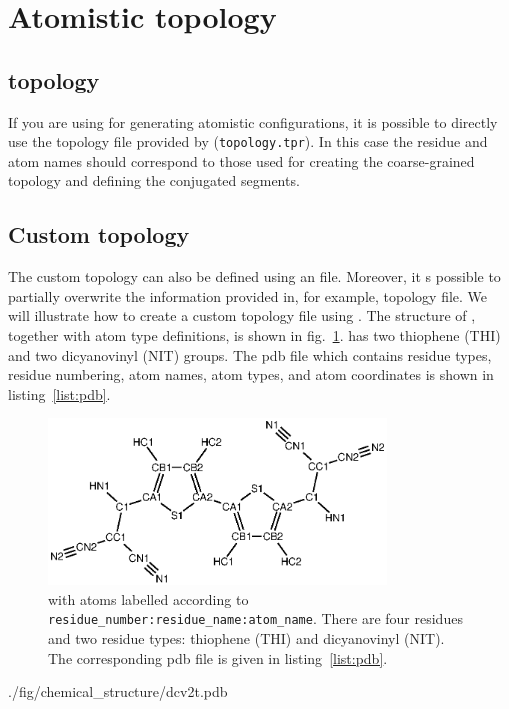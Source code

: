 \section{Atomistic topology}
\label{sec:atomistic}
\subsection{\gromacs topology}
If you are using \gromacs for generating atomistic configurations, it is possible to directly use the topology file provided by \gromacs (\texttt{topology.tpr}). In this case the residue and atom names should correspond to those used  for creating the coarse-grained topology and defining the conjugated segments. 

\subsection{Custom topology}
The custom topology can also be defined using an \xml file. Moreover, it s possible to partially overwrite the information provided in, for example, \gromacs topology file. We will illustrate how to create a custom topology file using \dcvt. The structure of \dcvt, together with atom type definitions, is shown in fig.~\ref{fig:dcv2t_at}. \dcvt has two thiophene (THI) and two dicyanovinyl (NIT) groups. The pdb file which contains residue types, residue numbering, atom names, atom types, and atom coordinates is shown in listing~\ref{list:pdb}.

\clearpage
\begin{figure}[ht]
\centering
\includegraphics[width=0.8\textwidth]{./fig/chemical_structure/dcv2t_atom_types}
\caption{\small \dcvt with atoms labelled according to \texttt{residue\_number:residue\_name:atom\_name}. There are four residues and two residue types: thiophene (THI) and dicyanovinyl (NIT). The corresponding pdb file is given in listing~\ref{list:pdb}.}
\label{fig:dcv2t_at}
\end{figure}

%
{./fig/chemical_structure/dcv2t.pdb}
\clearpage
